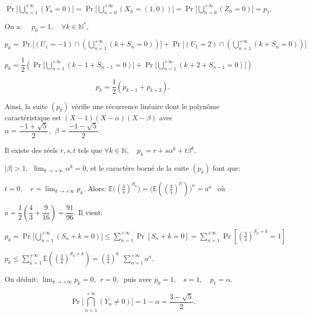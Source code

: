   $ \displaystyle \Pr\Big [\bigcup _{n=1}^{+\infty} (Y_n =0) \Big]=\Pr\Big[\bigcup _{n=0}^{+\infty} (X_n=(1,0))\Big] =\Pr\Big[\bigcup _{n=0}^{+\infty} (Z_n =0)\Big]= p_1.$
  
  On a: $\quad p_0 =1,\quad \forall k\in \mathbb N^*, $
  
  $p_k = \displaystyle \Pr \Big[ (U_1 =-1) \cap \left(\bigcup_{n=1}^{+\infty} (k +S_n =0)\right)\Big] + \Pr \Big[ (U_1 =2) \cap \left( \bigcup_{n=1}^{+\infty} (k +S_n=0) \right) \Big]$
  
  $p_k= \dfrac 12 \left (\displaystyle \Pr \Big[\bigcup_{n=1}^{+\infty} (k-1+S_{n-1}=0)\Big] + \Pr \Big[ \bigcup _{n=1}^{+\infty} (k+2+S_{n-1} = 0)\Big] \right)$
  
  $$p_k = \dfrac 12 ( p_{k-1} + p_{k+2}).$$
 
  Ainsi, la suite $(p_k)$ vérifie une récurrence linéaire dont le polynôme caractéristique est $(X-1)(X-\alpha)(X- \beta)$ avec $\alpha =\dfrac {-1+\sqrt5}2,\:\: \beta = \dfrac{-1-\sqrt 5}2.$
  
  Il existe des réels $r,s,t$ tels que $\forall k \in \mathbb N, \quad p_k =r+s\alpha ^k+t \beta^k.$
   
   $|\beta| >1,\:\: \displaystyle \lim _{k \to +\infty} \alpha^k =0 $, et le caractère borné de la suite $(p_k)$ font que: 
   
   $t=0,\quad \displaystyle r=\lim_{k\to + \infty} p_k.$
   Alors: $\mathbb E \big( (\frac 34)^{S_n} \big ) = \Big(\mathbb E \left((\frac 34)^{U}\right) \Big)^n = a ^n \:\:$ où 
   
   $a =\dfrac12 \left(\dfrac 43 + \dfrac 9{16}\right)= \dfrac {91}{96}.$ Il vient:
  
  $p_k = \displaystyle \Pr\Big[\bigcup _{n=1}^{+\infty} (S_n+k =0)\Big]\leqslant \sum_{n=1}^{+\infty} \Pr [S_n +k =0] = \sum_{n=1}^{+\infty} \Pr \left[\left(\frac34\right ) ^{S_n+k} =1\right]$
  
  $p_k\leqslant \displaystyle \sum_{n=1}^{+\infty} \mathbb E \left(\left (\frac 34 \right)^{S_n+k}\right) = \left(\frac 34 \right)^k\:\: \sum _{n=1}^{+\infty} a^n.$ 
  
  On déduit: $\displaystyle \lim _{k\to + \infty} p_k =0,\:\: r=0,\:$ puis avec $p_0 =1, \:\:\:\: s=1, \quad p_1 = \alpha.$
  
  $$ \displaystyle \boxed {\Pr\Big[\bigcap_{n=1}^{+\infty} (Y_n \neq 0) \Big] =1-\alpha = \dfrac {3 -\sqrt 5}2}. $$
  
 
  

 
 
